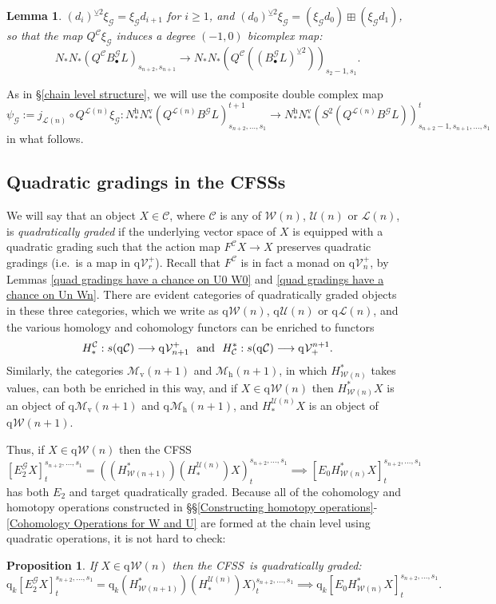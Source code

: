 \documentclass[11pt]{amsart} \renewcommand{\baselinestretch}{1.2}
\theoremstyle{plain}
\newtheorem{lem}[thm]{Lemma}
\newtheorem{prop}[thm]{Proposition}
\numberwithin{equation}{section} %
\theoremstyle{plain}
\newtheorem{lem}[thm]{Lemma}
\newtheorem{prop}[thm]{Proposition}
\numberwithin{equation}{chapter} %
\renewcommand{\to}{\longrightarrow}
\newcommand{\scrG}{\mathscr{G}}
\newcommand{\calU}{\mathcal{U}}
\newcommand{\calL}{\mathcal{L}}
\newcommand{\calV}{\mathcal{V}}
\newcommand{\calw}{\mathcal{W}}
\newcommand{\calu}{\mathcal{U}}
\newcommand{\call}{\mathcal{L}}
\newcommand{\calc}{\mathcal{C}}
\newcommand{\calMv}{\mathcal{M}\dver}
\newcommand{\calMh}{\mathcal{M}\dhor}
\newcommand{\vect}[2]{\calV^{#1}_{#2}}
\newcommand{\BSW}{{\scrG}}
\newcommand{\BSWres}{B^\BSW}%
\newcommand{\quadgrad}[1]{\mathrm{q}_{#1}}
\newcommand{\E}[5]{[E^{#1}_{#2}#3]^{#4}_{#5}}
\newcommand{\Edown}[4]{[E_{#1}#2]^{#3}_{#4}}
\newcommand{\uver}{^\mathrm{v}}
\newcommand{\uhor}{^\mathrm{h}}
\newcommand{\dver}{_\mathrm{v}}
\newcommand{\dhor}{_\mathrm{h}}
\newcommand{\smashcoprod}{\veebar}%
\newcommand{\CFSS}{CFSS}
\newcommand{\CFSSs}{CFSSs}
\newcommand{\SubsectionOrSection}[1]{\subsection{#1}}
\begin{document}
\begin{Comp funct sseqs}
\begin{lem}
$(d_i)^{\smashcoprod 2}\xi_\BSW =\xi_\BSW d_{i+1}$ for $i\geq1$, and $(d_0)^{\smashcoprod 2}\xi_\BSW = (\xi_\BSW d_{0})\boxplus(\xi_\BSW d_{1})$, so that the map $Q^{\calc}\xi_\BSW $ induces a degree $(-1,0)$ bicomplex map:
\[N_*N_*(Q^{\calc}B^\BSW_{\bullet}L)_{s_{n+2},s_{n+1}}\to
  N_*N_*(Q^{\calc}((B^\BSW_{\bullet}L)^{\smashcoprod 2}))_{s_2-1,s_1}.\]
\end{lem}
As in \S\ref{chain level structure}, we will use the composite double complex map
\[\psi_\BSW:=j_{\calL(n)}\circ Q^{\calL(n)}\xi_\BSW:N\uhor_*N\uver_*(Q^{\calL(n)}\BSWres L)_{s_{n+2},\ldots,s_1}^{t+1}\to N\uhor_*N\uver_*(S^2(Q^{\calL(n)}\BSWres L))_{s_{n+2}-1,s_{n+1},\ldots,s_1}^{t}\]
in what follows.


\SubsectionOrSection{Quadratic gradings in the \CFSSs}
\label{Quadratic grading}
We will say that an object $X\in\calc$, where $\calc$ is any of $\calw(n)$, $\calu(n)$ or $\call(n)$, is \emph{quadratically graded} if the underlying vector space of $X$ is equipped with a quadratic grading such that the action map
$F^{\calc}X\to X$ 
preserves quadratic gradings (i.e.\ is a map in $\quadgrad{}\vect{+}{r}$).
Recall that $F^{\calc}$ is in fact a monad on $\quadgrad{}\vect{+}{n}$, by Lemmas \ref{quad gradings have a chance on U0 W0} and \ref{quad gradings have a chance on Un Wn}. There are evident categories of quadratically graded objects in these three categories, which we write as $\quadgrad{}\calw(n)$, $\quadgrad{}\calu(n)$ or $\quadgrad{}\call(n)$, and the various homology and cohomology functors can be enriched to functors
\[H_*^{\calc}:s(\quadgrad{}\calc)\to \quadgrad{}\vect{+}{n+1}\textup{ \ and \ }H^*_{\calc}:s(\quadgrad{}\calc)\to \quadgrad{}\vect{n+1}{+}.\]
Similarly, the categories $\calMv(n+1)$ and $\calMh(n+1)$, in which $H^*_{\calw(n)}$ takes values, can both be enriched in this way, and if $X\in\quadgrad{}\calw(n)$ then 
$H^*_{\calw(n)}X$ is an object of $\quadgrad{}\calMv(n+1)$ and $\quadgrad{}\calMh(n+1)$, and 
$H_*^{\calu(n)}X$ is an object of $\quadgrad{}\calw(n+1)$.

Thus, if $X\in\quadgrad{}\calw(n)$ then the \CFSS
\[\E{\BSW}{2}{X}{s_{n+2},\ldots,s_1}{t}=((H^*_{\calw(n+1)})(H_*^{\calU(n)})X)^{s_{n+2},\ldots,s_1}_t\implies \Edown{0}{H^*_{\calw(n)}X}{s_{n+2},\ldots,s_1}{t}\]
has both $E_2$ and target quadratically graded. Because all of the cohomology and homotopy operations constructed in \S\S\ref{Constructing homotopy operations}-\ref{Cohomology Operations for W and U} are formed at the chain level using quadratic operations, it is not hard to check:
\begin{prop}
\label{prop: cfsseq is quad graded}
If $X\in\quadgrad{}\calw(n)$ then the \CFSS\ is quadratically graded:
\[\quadgrad{k}\E{\BSW}{2}{X}{s_{n+2},\ldots,s_1}{t}=\quadgrad{k}(H^*_{\calw(n+1)})(H_*^{\calU(n)})X)^{s_{n+2},\ldots,s_1}_t\implies \quadgrad{k}\Edown{0}{H^*_{\calw(n)}X}{s_{n+2},\ldots,s_1}{t}.\]
\end{prop}



\end{Comp funct sseqs}
\end{document}
